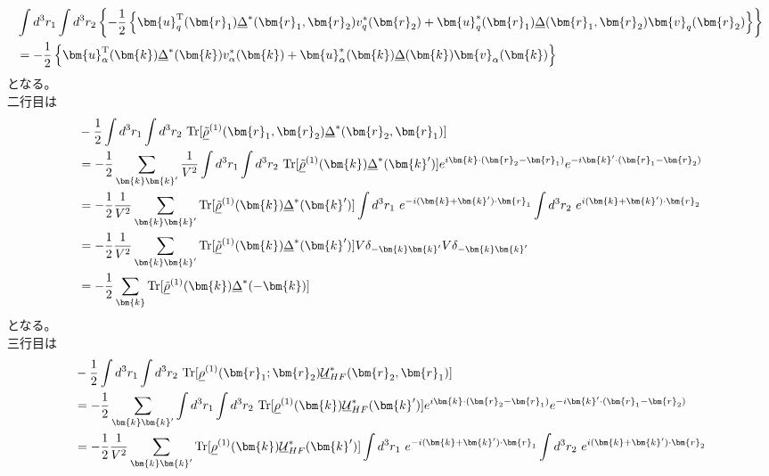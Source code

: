 \documentclass[dvipdfmx, 11pt, a4paper]{jsarticle}
\numberwithin{equation}{section}
\theoremstyle{definition}
\begin{document}
\begin{derivationBox}
\begin{align}
            &\int d^3r_1 \int d^3r_2 \left\{   -\frac{1}{2}\left\{\bm{u}_q^\mathrm{T}(\bm{r}_1)\underline{\Delta}^* (\bm{r}_1,\bm{r}_2) v^*_q(\bm{r}_2)   +  \bm{u}_q^*(\bm{r}_1)\underline{\Delta}(\bm{r}_1,\bm{r}_2)\bm{v}_q(\bm{r}_2) \right\}\right\}  \notag \\
            &=  -\frac{1}{2}\left\{\bm{u}_\alpha^\mathrm{T}(\bm{k})\underline{\Delta}^* (\bm{k}) v^*_\alpha(\bm{k})   +  \bm{u}_\alpha^*(\bm{k})\underline{\Delta}(\bm{k})\bm{v}_\alpha(\bm{k}) \right\}
        \end{align}
        となる。\\
        二行目は
        \begin{align}
            &- \frac{1}{2} \int d^3r_1 \int d^3r_2\ \mathrm{Tr}[\underline{\tilde{\rho}}^{(1)}(\bm{r}_1,\bm{r}_2)\underline{\Delta}^* (\bm{r}_2,\bm{r}_1)] \notag \\
            &= - \frac{1}{2}\sum_{\bm{k}\bm{k}'} \frac{1}{V^2}\int d^3r_1 \int d^3r_2\ \mathrm{Tr}[\underline{\tilde{\rho}}^{(1)}(\bm{k})\underline{\Delta}^* (\bm{k}')] e^{i\bm{k}\cdot(\bm{r}_2-\bm{r}_1)}e^{-i\bm{k}'\cdot(\bm{r}_1-\bm{r}_2)} \notag \\
            &= - \frac{1}{2} \frac{1}{V^2} \sum_{\bm{k}\bm{k}'}\mathrm{Tr}[\underline{\tilde{\rho}}^{(1)}(\bm{k})\underline{\Delta}^* (\bm{k}')] \int d^3r_1\ e^{-i(\bm{k}+\bm{k}')\cdot \bm{r}_1} \int d^3r_2\ e^{i(\bm{k}+\bm{k}')\cdot \bm{r}_2}  \notag \\
            &= - \frac{1}{2} \frac{1}{V^2}\sum_{\bm{k}\bm{k}'} \mathrm{Tr}[\underline{\tilde{\rho}}^{(1)}(\bm{k})\underline{\Delta}^* (\bm{k}')] V\delta_{-\bm{k}\bm{k}'} V\delta_{-\bm{k}\bm{k}'} \notag \\
            &= - \frac{1}{2} \sum_{\bm{k}}\mathrm{Tr}[\underline{\tilde{\rho}}^{(1)}(\bm{k})\underline{\Delta}^* (-\bm{k})] 
        \end{align}
        となる。\\
        三行目は
        \begin{align}
            &- \frac{1}{2}\int d^3r_1\int d^3r_2\ \mathrm{Tr}[\underline{\rho}^{(1)}(\bm{r}_1;\bm{r}_2)\underline{\mathcal{U}}_{HF}^*(\bm{r}_2,\bm{r}_1)] \notag \\
            &= - \frac{1}{2}\sum_{\bm{k}\bm{k}'}\int d^3r_1\int d^3r_2\ \mathrm{Tr}[\underline{\rho}^{(1)}(\bm{k})\underline{\mathcal{U}}_{HF}^*(\bm{k}')]  e^{i\bm{k}\cdot(\bm{r}_2-\bm{r}_1)} e^{-i\bm{k}'\cdot(\bm{r}_1-\bm{r}_2)} \notag \\
            &=- \frac{1}{2}\frac{1}{V^2} \sum_{\bm{k}\bm{k}'} \mathrm{Tr}[\underline{\rho}^{(1)}(\bm{k})\underline{\mathcal{U}}_{HF}^*(\bm{k}')]\int d^3r_1\ e^{-i(\bm{k}+\bm{k}')\cdot \bm{r}_1} \int d^3r_2\ e^{i(\bm{k}+\bm{k}')\cdot \bm{r}_2} \notag \\

\end{align}
\end{derivationBox}
\end{document}
